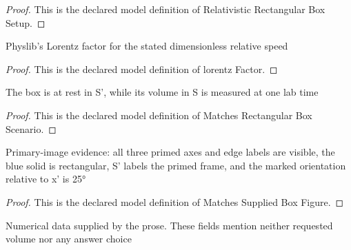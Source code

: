 \begin{proof}
  This is the declared model definition of Relativistic Rectangular Box Setup.
\end{proof}
\begin{definition}
  \label{def:physics:phyx-mini-0559:phyxminiproblems-problemphyxmini0559-lorentzfactor}
  Physlib's Lorentz factor for the stated dimensionless relative speed
\end{definition}
\begin{proof}
  This is the declared model definition of lorentz Factor.
\end{proof}
\begin{definition}
  \label{def:physics:phyx-mini-0559:phyxminiproblems-problemphyxmini0559-matchesrectangularboxscenario}
  The box is at rest in S', while its volume in S is measured at one lab time
\end{definition}
\begin{proof}
  This is the declared model definition of Matches Rectangular Box Scenario.
\end{proof}
\begin{definition}
  \label{def:physics:phyx-mini-0559:phyxminiproblems-problemphyxmini0559-matchessuppliedboxfigure}
  Primary-image evidence: all three primed axes and edge labels are visible, the blue solid is rectangular, S' labels the primed frame, and the marked orientation relative to x' is 25°
\end{definition}
\begin{proof}
  This is the declared model definition of Matches Supplied Box Figure.
\end{proof}
\begin{definition}
  \label{def:physics:phyx-mini-0559:phyxminiproblems-problemphyxmini0559-matchesproblemreadouts}
  Numerical data supplied by the prose. These fields mention neither requested volume nor any answer choice
\end{definition}
